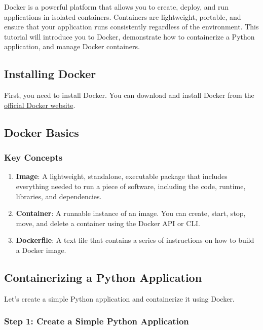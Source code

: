 \documentclass[
  letterpaper,
  DIV=11,
  numbers=noendperiod]{scrreprt}
\providecommand{\tightlist}{%
  \setlength{\itemsep}{0pt}\setlength{\parskip}{0pt}}\usepackage{longtable,booktabs,array}
\begin{document}
Docker is a powerful platform that allows you to create, deploy, and run
applications in isolated containers. Containers are lightweight,
portable, and ensure that your application runs consistently regardless
of the environment. This tutorial will introduce you to Docker,
demonstrate how to containerize a Python application, and manage Docker
containers.

\subsection{Installing Docker}\label{installing-docker-1}

First, you need to install Docker. You can download and install Docker
from the \href{https://www.docker.com/products/docker-desktop}{official
Docker website}.

\subsection{Docker Basics}\label{docker-basics-1}

\subsubsection{Key Concepts}\label{key-concepts-3}

\begin{enumerate}
\def\labelenumi{\arabic{enumi}.}
\tightlist
\item
  \textbf{Image}: A lightweight, standalone, executable package that
  includes everything needed to run a piece of software, including the
  code, runtime, libraries, and dependencies.
\item
  \textbf{Container}: A runnable instance of an image. You can create,
  start, stop, move, and delete a container using the Docker API or CLI.
\item
  \textbf{Dockerfile}: A text file that contains a series of
  instructions on how to build a Docker image.
\end{enumerate}

\subsection{Containerizing a Python
Application}\label{containerizing-a-python-application-1}

Let's create a simple Python application and containerize it using
Docker.

\subsubsection{Step 1: Create a Simple Python
Application}\label{step-1-create-a-simple-python-application-1}
\end{document}
